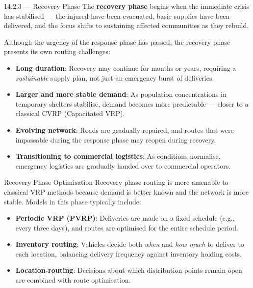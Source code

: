 \documentclass[aspectratio=169,10pt]{beamer}
\begin{document}
\begin{frame}[allowframebreaks]{14.2.3 --- Recovery Phase}
  The \textbf{recovery phase} begins when the immediate crisis has
  stabilised --- the injured have been evacuated, basic supplies have
  been delivered, and the focus shifts to sustaining affected communities
  as they rebuild.

  \medskip
  Although the urgency of the response phase has passed, the recovery
  phase presents its own routing challenges:
  \begin{itemize}
    \item \textbf{Long duration}: Recovery may continue for months or
          years, requiring a \emph{sustainable} supply plan, not just
          an emergency burst of deliveries.
    \item \textbf{Larger and more stable demand}: As population
          concentrations in temporary shelters stabilise, demand becomes
          more predictable --- closer to a classical CVRP (Capacitated VRP).
    \item \textbf{Evolving network}: Roads are gradually repaired, and
          routes that were impassable during the response phase may
          reopen during recovery.
    \item \textbf{Transitioning to commercial logistics}: As conditions
          normalise, emergency logistics are gradually handed over to
          commercial operators.
  \end{itemize}

  \framebreak

  \begin{block}{Recovery Phase Optimisation}
    Recovery phase routing is more amenable to classical VRP methods
    because demand is better known and the network is more stable.
    Models in this phase typically include:
    \begin{itemize}
      \item \textbf{Periodic VRP (PVRP)}: Deliveries are made on a
            fixed schedule (e.g., every three days), and routes are
            optimised for the entire schedule period.
      \item \textbf{Inventory routing}: Vehicles decide both \emph{when}
            and \emph{how much} to deliver to each location, balancing
            delivery frequency against inventory holding costs.
      \item \textbf{Location-routing}: Decisions about which distribution
            points remain open are combined with route optimisation.
    \end{itemize}
  \end{block}


\end{frame}
\end{document}
